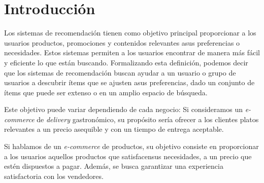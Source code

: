 \documentclass[11pt,a4paper,twoside]{thesis}
\begin{document}

\def\autor{Adrian Norberto Marino}
\def\tituloTesis{Sistemas de Recomendación Colaborativos}
\def\runtitulo{Resumen}
\def\runtitle{Sistemas de Recomendación Colaborativos}


\def\lugar{Buenos Aires, 2022}


%
\frontmatter
\pagestyle{empty}

%
%
\cleardoublepage
%
%
%
\tableofcontents
%
%
\mainmatter
\pagestyle{headings}
%
%
%
%


\chapter{Introducción}

Los sistemas de recomendación tienen como objetivo principal proporcionar a los
usuarios productos, promociones y contenidos relevantes asus preferencias o
necesidades. Estos sistemas permiten a los usuarios encontrar de manera más
fácil y eficiente lo que están buscando. Formalizando esta definición, podemos
decir que los sistemas de recomendación buscan ayudar a un usuario o grupo de
usuarios a descubrir ítems que se ajusten asus preferencias, dado un conjunto
de ítems que puede ser extenso o en un amplio espacio de búsqueda.

\begin{sloppypar}
	Este objetivo puede variar dependiendo de cada negocio: Si consideramos un
	\textit{e-commerce} de \textit{delivery} gastronómico, su propósito sería
	ofrecer a los clientes platos relevantes a un precio asequible y con un tiempo
	de entrega aceptable.
\end{sloppypar}

Si hablamos de un \textit{e-commerce} de productos, su objetivo consiste en
proporcionar a los usuarios aquellos productos que satisfacensus necesidades, a
un precio que estén dispuestos a pagar. Además, se busca garantizar una
experiencia satisfactoria con los vendedores.
\end{document}
